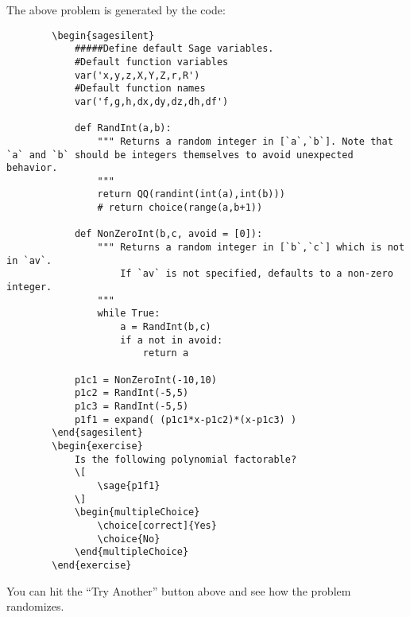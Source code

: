 \documentclass{ximera}
\begin{document}
The above problem is generated by the code:
    \begin{verbatim}
        \begin{sagesilent}
            #####Define default Sage variables.
            #Default function variables
            var('x,y,z,X,Y,Z,r,R')
            #Default function names
            var('f,g,h,dx,dy,dz,dh,df')
            
            def RandInt(a,b):
                """ Returns a random integer in [`a`,`b`]. Note that `a` and `b` should be integers themselves to avoid unexpected behavior.
                """
                return QQ(randint(int(a),int(b)))
                # return choice(range(a,b+1))
            
            def NonZeroInt(b,c, avoid = [0]):
                """ Returns a random integer in [`b`,`c`] which is not in `av`. 
                    If `av` is not specified, defaults to a non-zero integer.
                """
                while True:
                    a = RandInt(b,c)
                    if a not in avoid:
                        return a
            
            p1c1 = NonZeroInt(-10,10)
            p1c2 = RandInt(-5,5)
            p1c3 = RandInt(-5,5)
            p1f1 = expand( (p1c1*x-p1c2)*(x-p1c3) )
        \end{sagesilent}
        \begin{exercise}
            Is the following polynomial factorable? 
            \[
                \sage{p1f1}
            \]
            \begin{multipleChoice}
                \choice[correct]{Yes}
                \choice{No}
            \end{multipleChoice}
        \end{exercise}
    \end{verbatim}
    
    You can hit the ``Try Another'' button above and see how the problem randomizes.
    
    
\end{document}
